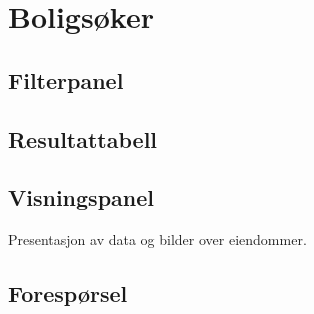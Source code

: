 \section{Boligsøker}

\subsection{Filterpanel}
\subsection{Resultattabell}
\subsection{Visningspanel}
Presentasjon av data og bilder over eiendommer.
\subsection{Forespørsel}